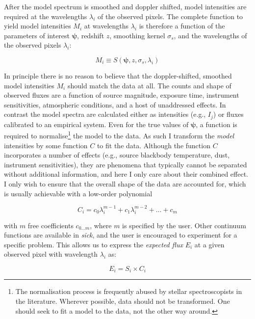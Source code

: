 \documentclass{aastex}
\newcommand{\sick}{\textit{sick}}
\begin{document}
After the model spectrum is smoothed and doppler shifted, model intensities are 
required at the wavelengths $\lambda_i$ of the observed pixels. The complete 
function to yield model intensities $M_i$ at wavelengths $\lambda_i$ is therefore 
a function of the parameters of interest $\bm{\psi}$, redshift $z$, smoothing 
kernel $\sigma_{s}$, and the wavelengths of the observed pixels $\lambda_i$:

\begin{equation}
 M_{i} \equiv S\left(\bm{\psi},z,\sigma_{s},\lambda_i\right)
\end{equation}

In principle there is no reason to believe that the doppler-shifted, smoothed 
model intensities $M_i$ should match the data at all. The counts and shape of 
observed fluxes are a function of source magnitude, exposure time, instrument 
sensitivities, atmospheric conditions, and a host of unaddressed effects. In 
contrast the model spectra are calculated either as intensities (e.g., $I_j$) 
or fluxes calibrated to an empirical system. Even for the true values of 
$\bm{\psi}$, a function is required to normalise\footnote{The normalisation 
process is frequently abused by stellar spectroscopists in the literature. 
Wherever possible, data should not be transformed. One should seek to fit a 
model to the data, not the other way around.} the model to the data. As such I 
transform the \textit{model} intensities by some function $C$ to fit the data. 
Although the function $C$ incorporates a number of effects (e.g., source 
blackbody temperature, dust, instrument sensitivities), they are phenomena that 
typically cannot be separated without additional information, and here I only 
care about their combined effect. I only wish to ensure that the overall shape 
of the data are accounted for, which is usually achievable with a low-order 
polynomial

\begin{equation}
C_i = c_{0}\lambda_{i}^{m-1} + c_{1}\lambda_{i}^{m-2} + \dots + c_{m}
\end{equation}

\noindent{}with $m$ free coefficients $c_{0\dots{}m}$, where $m$ is specified by 
the user. Other continuum functions are available in \sick{}, and the user is 
encouraged to experiment for a specific problem. This allows us to express the 
\textit{expected flux} $E_i$ at a given observed pixel with wavelength $\lambda_i$ as:

\begin{equation}
E_i = S_{i}\times{}C_i
\end{equation}
\end{document}
